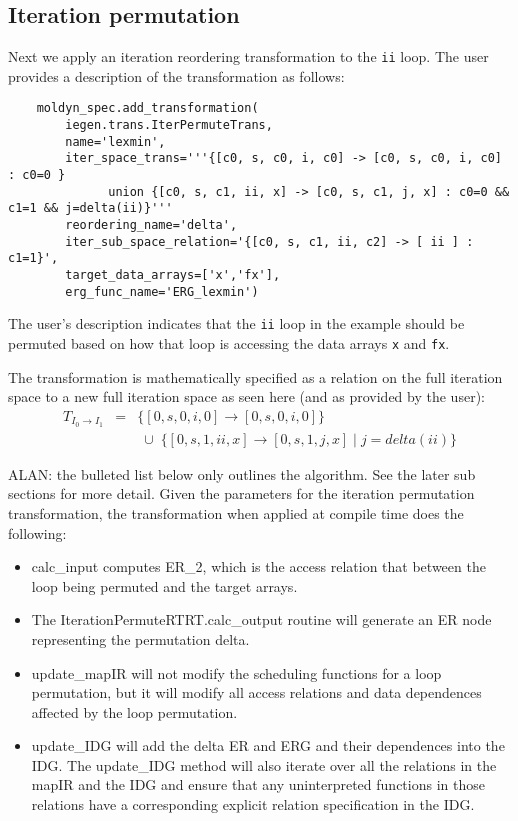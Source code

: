 \documentclass{article}
\begin{document}
\subsection{Iteration permutation}
Next we apply an iteration reordering transformation to the {\tt ii} loop.
The user provides a description of the transformation as follows:
\begin{verbatim}
    moldyn_spec.add_transformation(
        iegen.trans.IterPermuteTrans,
        name='lexmin',
        iter_space_trans='''{[c0, s, c0, i, c0] -> [c0, s, c0, i, c0] : c0=0 }
              union {[c0, s, c1, ii, x] -> [c0, s, c1, j, x] : c0=0 && c1=1 && j=delta(ii)}'''
        reordering_name='delta',
        iter_sub_space_relation='{[c0, s, c1, ii, c2] -> [ ii ] : c1=1}',
        target_data_arrays=['x','fx'],
        erg_func_name='ERG_lexmin')  
\end{verbatim}
The user's description indicates that the {\tt ii} loop in the example should be permuted
based on how that loop is accessing the data arrays {\tt x} and {\tt fx}.

The transformation is mathematically specified as a relation on the full
iteration space to a new full iteration space as seen here (and as provided by the user):
\[
\begin{array}{rcl}
	T_{I_0 \rightarrow I_1} & = & \{ [0, s, 0, i, 0 ] \rightarrow [ 0, s, 0, i, 0]  \} \\
	& & \; \cup \; \{ [0, s, 1, ii, x ] \rightarrow [ 0, s, 1, j, x] \; | \; j = delta(ii) \}
\end{array}
\]

ALAN: the bulleted list below only outlines the algorithm.  See the later sub sections for more detail.
Given the parameters for the iteration permutation transformation, 
the transformation when applied at compile time does the following:
	\begin{itemize}	
	\item calc\_input computes ER\_2, which is the access relation that between the loop being permuted and the target arrays.

\item The IterationPermuteRTRT.calc\_output routine will generate an ER node representing the permutation delta.

\item update\_mapIR will not modify the scheduling functions for a loop permutation, but
it will modify all access relations and data dependences affected by the loop permutation.
 
\item update\_IDG will add the delta ER and ERG and their dependences into the IDG.  The update\_IDG method will also iterate over all the relations in the mapIR and the IDG and ensure that any uninterpreted functions in those relations have a corresponding explicit relation specification in the IDG.
	\end{itemize}
	
\end{document}
